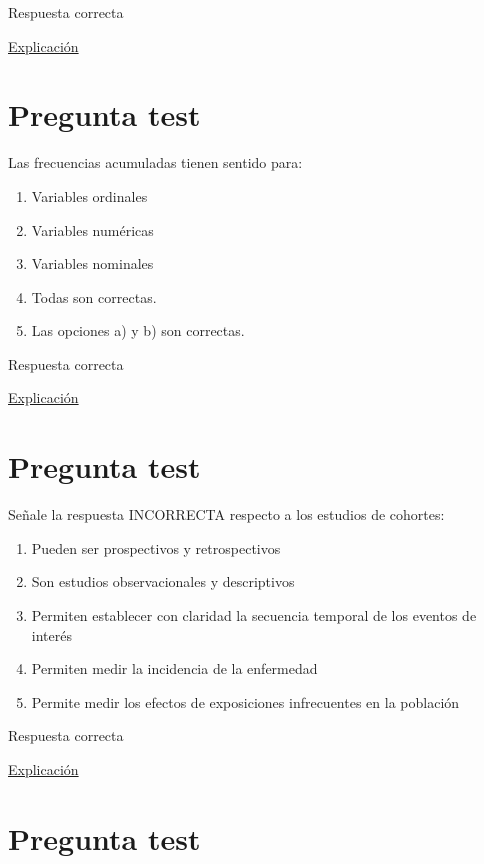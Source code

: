 \documentclass[
]{book}
\providecommand{\tightlist}{%
  \setlength{\itemsep}{0pt}\setlength{\parskip}{0pt}}
\begin{document}
Respuesta correcta

\href{https://es.wikipedia.org/wiki/Prevención_secundaria}{Explicación}

\hypertarget{pregunta-test-33}{%
\section{Pregunta test}\label{pregunta-test-33}}

Las frecuencias acumuladas tienen sentido para:

\begin{enumerate}
\def\labelenumi{\alph{enumi})}
\tightlist
\item
  Variables ordinales
\item
  Variables numéricas
\item
  Variables nominales
\item
  Todas son correctas.
\item
  Las opciones a) y b) son correctas.
\end{enumerate}

Respuesta correcta

\href{https://1fjmanzano.github.io/bioestadistica/tablas-de-frecuencias.html}{Explicación}

\hypertarget{pregunta-test-34}{%
\section{Pregunta test}\label{pregunta-test-34}}

Señale la respuesta INCORRECTA respecto a los estudios de cohortes:

\begin{enumerate}
\def\labelenumi{\alph{enumi})}
\tightlist
\item
  Pueden ser prospectivos y retrospectivos
\item
  Son estudios observacionales y descriptivos
\item
  Permiten establecer con claridad la secuencia temporal de los eventos de interés
\item
  Permiten medir la incidencia de la enfermedad
\item
  Permite medir los efectos de exposiciones infrecuentes en la población
\end{enumerate}

Respuesta correcta

\href{https://es.wikipedia.org/wiki/Estudio_de_cohorte}{Explicación}

\hypertarget{pregunta-test-35}{%
\section{Pregunta test}\label{pregunta-test-35}}
\end{document}
